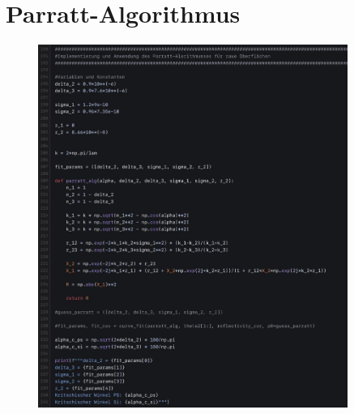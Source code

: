 \newpage
\section{Parratt-Algorithmus}

    \FloatBarrier
    \begin{figure}[h]
        \centering
        \includegraphics[width = 0.9\textwidth]{pictures/parratt_alg.jpg}
      \end{figure}
  
    \FloatBarrier